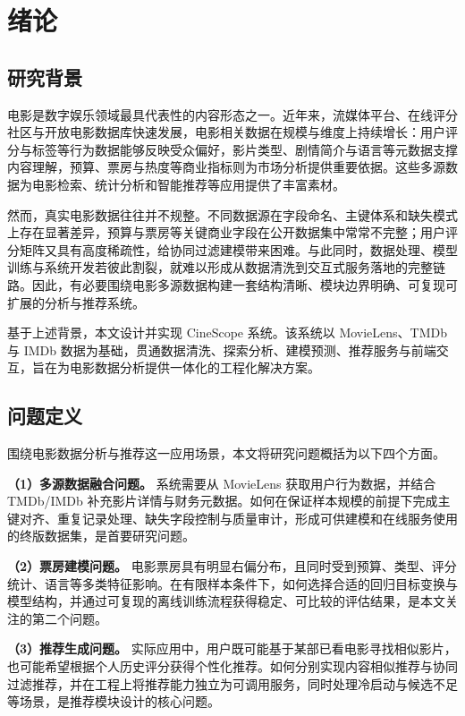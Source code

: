 \chapter{绪论}
\label{chap:intro}

\section{研究背景}
\label{sec:intro:background}

电影是数字娱乐领域最具代表性的内容形态之一。近年来，流媒体平台、在线评分社区与开放电影数据库快速发展，电影相关数据在规模与维度上持续增长：用户评分与标签等行为数据能够反映受众偏好，影片类型、剧情简介与语言等元数据支撑内容理解，预算、票房与热度等商业指标则为市场分析提供重要依据。这些多源数据为电影检索、统计分析和智能推荐等应用提供了丰富素材。

然而，真实电影数据往往并不规整。不同数据源在字段命名、主键体系和缺失模式上存在显著差异，预算与票房等关键商业字段在公开数据集中常常不完整；用户评分矩阵又具有高度稀疏性，给协同过滤建模带来困难。与此同时，数据处理、模型训练与系统开发若彼此割裂，就难以形成从数据清洗到交互式服务落地的完整链路。因此，有必要围绕电影多源数据构建一套结构清晰、模块边界明确、可复现可扩展的分析与推荐系统。

基于上述背景，本文设计并实现 CineScope 系统。该系统以 MovieLens、TMDb 与 IMDb 数据为基础，贯通数据清洗、探索分析、建模预测、推荐服务与前端交互，旨在为电影数据分析提供一体化的工程化解决方案。

\section{问题定义}
\label{sec:intro:problem}

围绕电影数据分析与推荐这一应用场景，本文将研究问题概括为以下四个方面。

\textbf{（1）多源数据融合问题。} 系统需要从 MovieLens 获取用户行为数据，并结合 TMDb/IMDb 补充影片详情与财务元数据。如何在保证样本规模的前提下完成主键对齐、重复记录处理、缺失字段控制与质量审计，形成可供建模和在线服务使用的终版数据集，是首要研究问题。

\textbf{（2）票房建模问题。} 电影票房具有明显右偏分布，且同时受到预算、类型、评分统计、语言等多类特征影响。在有限样本条件下，如何选择合适的回归目标变换与模型结构，并通过可复现的离线训练流程获得稳定、可比较的评估结果，是本文关注的第二个问题。

\textbf{（3）推荐生成问题。} 实际应用中，用户既可能基于某部已看电影寻找相似影片，也可能希望根据个人历史评分获得个性化推荐。如何分别实现内容相似推荐与协同过滤推荐，并在工程上将推荐能力独立为可调用服务，同时处理冷启动与候选不足等场景，是推荐模块设计的核心问题。

